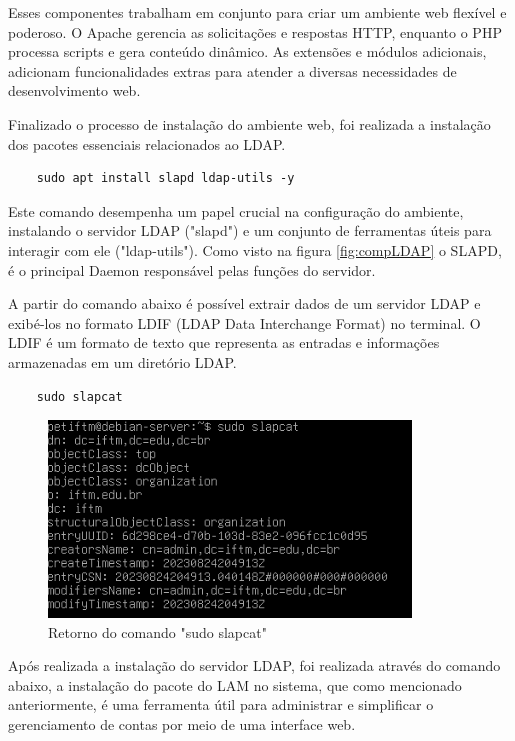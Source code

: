 Esses componentes trabalham em conjunto para criar um ambiente web flexível e poderoso. O Apache gerencia as solicitações e respostas HTTP, enquanto o PHP processa scripts e gera conteúdo dinâmico. As extensões e módulos adicionais, adicionam funcionalidades extras para atender a diversas necessidades de desenvolvimento web.

Finalizado o processo de instalação do ambiente web, foi realizada  a instalação dos pacotes essenciais relacionados ao LDAP.

\begin{lstlisting}
    sudo apt install slapd ldap-utils -y
\end{lstlisting}

Este comando desempenha um papel crucial na configuração do ambiente, instalando o servidor LDAP ("slapd") e um conjunto de ferramentas úteis para interagir com ele ("ldap-utils"). Como visto na figura \ref{fig:compLDAP} o SLAPD, é o principal Daemon responsável pelas funções do servidor.

A partir do comando abaixo é possível extrair dados de um servidor LDAP e exibé-los no formato LDIF (LDAP Data Interchange Format) no terminal. O LDIF é um formato de texto que representa as entradas e informações armazenadas em um diretório LDAP.

\begin{lstlisting}
    sudo slapcat
\end{lstlisting}

\begin{figure}[h]
	\centering
	\includegraphics[scale=0.8]{textuais/codigo3.png}
	\caption{Retorno do comando "sudo slapcat"
	\label{fig:sudoslapcat}}
\end{figure}

Após realizada a instalação do servidor LDAP, foi realizada através do comando abaixo, a instalação do pacote do LAM no sistema, que como mencionado anteriormente, é uma ferramenta útil para administrar e simplificar o gerenciamento de contas por meio de uma interface web.

